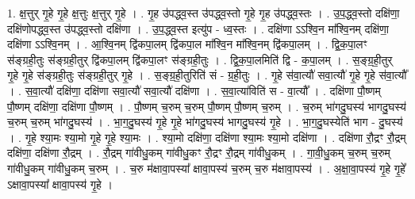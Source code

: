 \documentclass[17pt]{extarticle}
\begin{document}
1. क्ष॒त्तुर् गृ॒हे गृ॒हे क्ष॒त्तुः क्ष॒त्तुर् गृ॒हे । . गृ॒ह उ॑पद्ध्व॒स्त उ॑पद्ध्व॒स्तो गृ॒हे गृ॒ह उ॑पद्ध्व॒स्तः । . उ॒प॒द्ध्व॒स्तो दक्षि॑णा॒ दक्षि॑णोपद्ध्व॒स्त उ॑पद्ध्व॒स्तो दक्षि॑णा । . उ॒प॒द्ध्व॒स्त इत्यु॑प - ध्व॒स्तः । . दक्षि॑णा ऽऽश्वि॒न मा᳚श्वि॒नम् दक्षि॑णा॒ दक्षि॑णा ऽऽश्वि॒नम् । . आ॒श्वि॒नम् द्वि॑कपा॒लम् द्वि॑कपा॒ल मा᳚श्वि॒न मा᳚श्वि॒नम् द्वि॑कपा॒लम् । . द्वि॒क॒पा॒लꣳ स॑ङ्ग्रही॒तुः स॑ङ्ग्रही॒तुर् द्वि॑कपा॒लम् द्वि॑कपा॒लꣳ स॑ङ्ग्रही॒तुः । . द्वि॒क॒पा॒लमिति॑ द्वि - क॒पा॒लम् । . स॒ङ्ग्र॒ही॒तुर् गृ॒हे गृ॒हे स॑ङ्ग्रही॒तुः स॑ङ्ग्रही॒तुर् गृ॒हे । . स॒ङ्ग्र॒ही॒तुरिति॑ सं - ग्र॒ही॒तुः । . गृ॒हे स॑वा॒त्यौ॑ सवा॒त्यौ॑ गृ॒हे गृ॒हे स॑वा॒त्यौ᳚ । . स॒वा॒त्यौ॑ दक्षि॑णा॒ दक्षि॑णा सवा॒त्यौ॑ सवा॒त्यौ॑ दक्षि॑णा । . स॒वा॒त्या॑विति॑ स - वा॒त्यौ᳚ । . दक्षि॑णा पौ॒ष्णम् पौ॒ष्णम् दक्षि॑णा॒ दक्षि॑णा पौ॒ष्णम् । . पौ॒ष्णम् च॒रुम् च॒रुम् पौ॒ष्णम् पौ॒ष्णम् च॒रुम् । . च॒रुम् भा॑गदु॒घस्य॑ भागदु॒घस्य॑ च॒रुम् च॒रुम् भा॑गदु॒घस्य॑ । . भा॒ग॒दु॒घस्य॑ गृ॒हे गृ॒हे भा॑गदु॒घस्य॑ भागदु॒घस्य॑ गृ॒हे । . भा॒ग॒दु॒घस्येति॑ भाग - दु॒घस्य॑ । . गृ॒हे श्या॒मः श्या॒मो गृ॒हे गृ॒हे श्या॒मः । . श्या॒मो दक्षि॑णा॒ दक्षि॑णा श्या॒मः श्या॒मो दक्षि॑णा । . दक्षि॑णा रौ॒द्रꣳ रौ॒द्रम् दक्षि॑णा॒ दक्षि॑णा रौ॒द्रम् । . रौ॒द्रम् गा॑वीधु॒कम् गा॑वीधु॒कꣳ रौ॒द्रꣳ रौ॒द्रम् गा॑वीधु॒कम् । . गा॒वी॒धु॒कम् च॒रुम् च॒रुम् गा॑वीधु॒कम् गा॑वीधु॒कम् च॒रुम् । . च॒रु म॑क्षावा॒पस्या᳚ क्षावा॒पस्य॑ च॒रुम् च॒रु म॑क्षावा॒पस्य॑ । . अ॒क्षा॒वा॒पस्य॑ गृ॒हे गृ॒हे᳚ ऽक्षावा॒पस्या᳚ क्षावा॒पस्य॑ गृ॒हे । \newline
\end{document}

